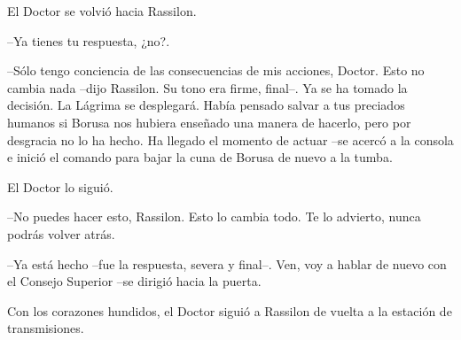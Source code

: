 El Doctor se volvió hacia Rassilon. 



--Ya tienes tu respuesta, ¿no?. 

--Sólo tengo conciencia de las consecuencias de mis acciones, Doctor. Esto no cambia nada --dijo Rassilon. Su tono era firme, final--. Ya se ha tomado la decisión. La Lágrima se desplegará. Había pensado salvar a tus preciados humanos si Borusa nos hubiera enseñado una manera de hacerlo, pero por desgracia no lo ha hecho. Ha llegado el momento de actuar --se acercó a la consola e inició el comando para bajar la cuna de Borusa de nuevo a la tumba. 



El Doctor lo siguió. 



--No puedes hacer esto, Rassilon. Esto lo cambia todo. Te lo advierto, nunca podrás volver atrás. 

--Ya está hecho --fue la respuesta, severa y final--. Ven, voy a hablar de nuevo con el Consejo Superior --se dirigió hacia la puerta.



Con los corazones hundidos, el Doctor siguió a Rassilon de vuelta a la estación de transmisiones.



